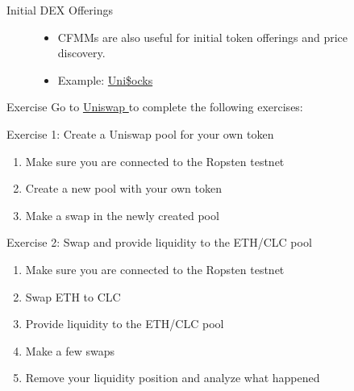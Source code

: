 \documentclass[]{beamer}
\begin{document}
\begin{frame}{Initial DEX Offerings}

	\begin{figure}
		\begin{minipage}[c]{0.3\textwidth}
			
		\end{minipage}
		\hfill
		\begin{minipage}[c]{0.5\textwidth}
			\begin{itemize}
				\item CFMMs are also useful for initial token offerings and price discovery.
				\item Example: \href{https://unisocks.exchange/}{Uni\$ocks} \link
			\end{itemize}
		\end{minipage}
	\end{figure}

\end{frame}


\begin{frame}{Exercise}
	Go to \href{https://app.uniswap.org/}{Uniswap \link} to complete the following exercises:
	\vspace{.5cm}

	\begin{exercise}{Exercise 1: Create a Uniswap pool for your own token}
		\begin{enumerate}
			\item Make sure you are connected to the Ropsten testnet
			\item Create a new pool with your own token
			\item Make a swap in the newly created pool
		\end{enumerate}
	\end{exercise}
	\vspace{.5cm}
	\begin{exercise}{Exercise 2: Swap and provide liquidity to the ETH/CLC pool}
		\begin{enumerate}
			\item Make sure you are connected to the Ropsten testnet
			\item Swap ETH to CLC
			\item Provide liquidity to the ETH/CLC pool
			\item Make a few swaps
			\item Remove your liquidity position and analyze what happened
		\end{enumerate}
	\end{exercise}
\end{frame}
\end{document}

